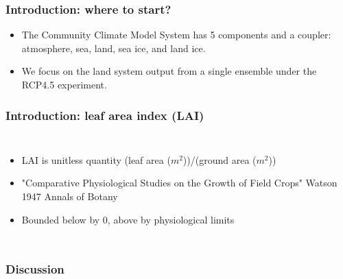 \documentclass{beamer}
\begin{document}
\begin{frame}
    \frametitle{Introduction: where to start?}
    \begin{itemize}
        \item The Community Climate Model System has 5 components and a coupler:
            atmosphere, sea, land, sea ice, and land ice.
        \item We focus on the land system output from a single ensemble under
            the RCP4.5 experiment.
    \end{itemize}
\end{frame}

\begin{frame}
    \frametitle{Introduction: leaf area index (LAI)}
    \begin{columns}

        \column{2in}
            \begin{itemize}
                \item LAI is unitless quantity (leaf area ($m^2$))/(ground area ($m^2$))
                \item "Comparative Physiological Studies on the Growth of Field Crops" Watson 1947 Annals of Botany
                \item Bounded below by 0, above by physiological limits
            \end{itemize}

        \column{3in}

    \end{columns}
\end{frame}


\begin{frame}
    \frametitle{Discussion}
\end{frame}
\end{document}
